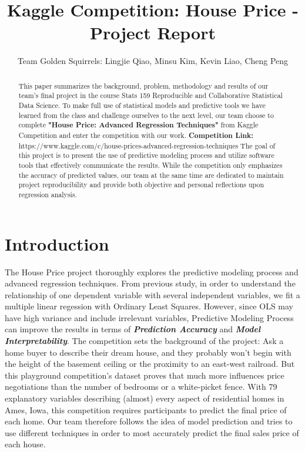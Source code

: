 \documentclass[a4paper]{article}
\title{Kaggle Competition: House Price - Project Report}
\author{Team Golden Squirrels: Lingjie Qiao, Minsu Kim, Kevin Liao, Cheng Peng}
\begin{document}

\maketitle

\begin{abstract}
This paper summarizes the background, problem, methodology and results of our team's final project in the course Stats 159 Reproducible and Collaborative Statistical Data Science. To make full use of statistical models and predictive tools we have learned from the class and challenge ourselves to the next level, our team choose to complete \textbf{"House Price: Advanced Regression Techniques"} from Kaggle Competition and enter the competition with our work. 
\newline
\newline
\textbf{Competition Link:} 
https://www.kaggle.com/c/house-prices-advanced-regression-techniques
\newline
\newline
The goal of this project is to present the use of predictive modeling process and utilize software tools that effectively communicate the results. While the competition only emphasizes the accuracy of predicted values, our team at the same time are dedicated to maintain project reproducibility and provide both objective and personal reflections upon regression analysis.
\end{abstract}

\section{Introduction}
The House Price project thoroughly explores the predictive modeling process and advanced regression techniques. From previous study, in order to understand the relationship of one dependent variable with several independent variables, we fit a multiple linear regession with Ordinary Least Squares. However, since OLS may have high variance and include irrelevant variables, Predictive Modeling Process can improve the results in terms of \textbf{\textit{Prediction Accuracy}} and \textbf{\textit{Model Interpretability}}. 
\newline
\newline
The competition sets the background of the project: Ask a home buyer to describe their dream house, and they probably won't begin with the height of the basement ceiling or the proximity to an east-west railroad. But this playground competition's dataset proves that much more influences price negotiations than the number of bedrooms or a white-picket fence.
\newline
\newline
With 79 explanatory variables describing (almost) every aspect of residential homes in Ames, Iowa, this competition requires participants to predict the final price of each home. Our team therefore follows the idea of model prediction and tries to use different techniques in order to most accurately predict the final sales price of each house.
\end{document}
